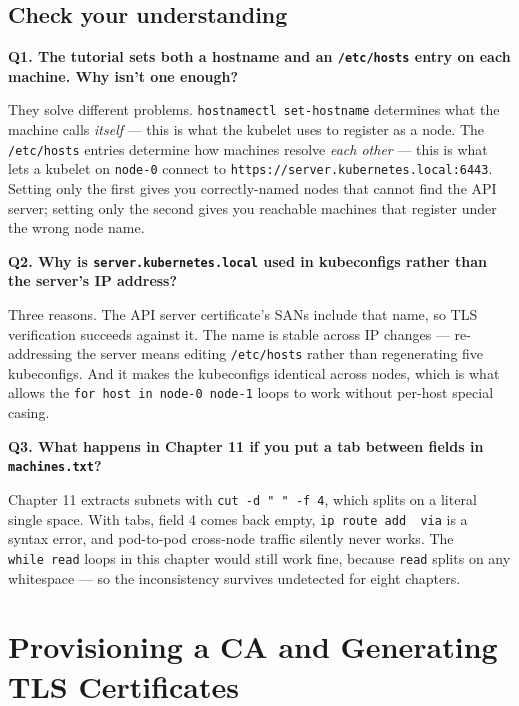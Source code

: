 \documentclass[11pt,oneside]{report}
\begin{document}
\hypertarget{check-your-understanding-3}{%
\section{Check your
understanding}\label{check-your-understanding-3}}

\textbf{Q1. The
tutorial sets both a
hostname and an
\texttt{/etc/hosts}
entry on each
machine. Why isn't
one enough?}

They solve different
problems.
\texttt{hostnamectl\ set-}\allowbreak{}\texttt{hostname}
determines what the
machine calls
\emph{itself} ---
this is what the
kubelet uses to
register as a node.
The
\texttt{/etc/hosts}
entries determine
how machines resolve
\emph{each other}
--- this is what
lets a kubelet on
\texttt{node-0}
connect to
\texttt{https:}\allowbreak{}\texttt{/}\allowbreak{}\texttt{/}\allowbreak{}\texttt{server.}\allowbreak{}\texttt{kubernetes.}\allowbreak{}\texttt{local:}\allowbreak{}\texttt{6443}.
Setting only the
first gives you
correctly-named
nodes that cannot
find the API server;
setting only the
second gives you
reachable machines
that register under
the wrong node name.

\textbf{Q2. Why is
\texttt{server.}\allowbreak{}\texttt{kubernetes.}\allowbreak{}\texttt{local}
used in kubeconfigs
rather than the
server's IP
address?}

Three reasons. The
API server
certificate's SANs
include that name,
so TLS verification
succeeds against it.
The name is stable
across IP changes
--- re-addressing
the server means
editing
\texttt{/etc/hosts}
rather than
regenerating five
kubeconfigs. And it
makes the
kubeconfigs
identical across
nodes, which is what
allows the
\texttt{for\ host\ in\ node-}\allowbreak{}\texttt{0\ node-}\allowbreak{}\texttt{1}
loops to work
without per-host
special casing.

\textbf{Q3. What
happens in Chapter
11 if you put a tab
between fields in
\texttt{machines.txt}?}

Chapter 11 extracts
subnets with
\texttt{cut\ -d\ "\ "\ -f\ 4},
which splits on a
literal single
space. With tabs,
field 4 comes back
empty,
\texttt{ip\ route\ add\ \ via}
is a syntax error,
and pod-to-pod
cross-node traffic
silently never
works. The
\texttt{while\ read}
loops in this
chapter would still
work fine, because
\texttt{read} splits
on any whitespace
--- so the
inconsistency
survives undetected
for eight chapters.

\hypertarget{chap-4}{%
\chapter{Provisioning
a CA and Generating
TLS
Certificates}\label{chap-4}}
\end{document}
